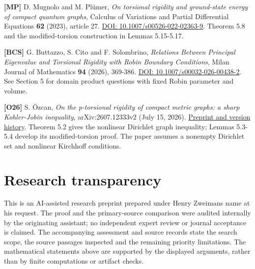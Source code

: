\documentclass[11pt]{article}
\begin{document}
\textbf{{[}MP{]}} D. Mugnolo and M. Plümer, \emph{On torsional rigidity
and ground-state energy of compact quantum graphs}, Calculus of
Variations and Partial Differential Equations \textbf{62} (2023),
article 27. \href{https://doi.org/10.1007/s00526-022-02363-9}{DOI:
10.1007/s00526-022-02363-9}. Theorem 5.8 and the modified-torsion
construction in Lemmas 5.15-5.17.

\textbf{{[}BCS{]}} G. Buttazzo, S. Cito and F. Solombrino,
\emph{Relations Between Principal Eigenvalue and Torsional Rigidity with
Robin Boundary Conditions}, Milan Journal of Mathematics \textbf{94}
(2026), 369-386. \href{https://doi.org/10.1007/s00032-026-00438-2}{DOI:
10.1007/s00032-026-00438-2}. See Section 5 for domain product questions
with fixed Robin parameter and volume.

\textbf{{[}O26{]}} S. Özcan, \emph{On the p-torsional rigidity of
compact metric graphs: a sharp Kohler-Jobin inequality},
arXiv:2607.12333v2 (July 15, 2026).
\href{https://arxiv.org/abs/2607.12333}{Preprint and version history}.
Theorem 5.2 gives the nonlinear Dirichlet graph inequality; Lemmas
5.3-5.4 develop its modified-torsion proof. The paper assumes a nonempty
Dirichlet set and nonlinear Kirchhoff conditions.

\section{Research transparency}\label{research-transparency}

This is an AI-assisted research preprint prepared under Henry
Zweiman\textquotesingle s name at his request. The proof and the
primary-source comparison were audited internally by the originating
assistant; no independent expert review or journal acceptance is
claimed. The accompanying assessment and source records state the search
scope, the source passages inspected and the remaining priority
limitations. The mathematical statements above are supported by the
displayed arguments, rather than by finite computations or artifact
checks.
\end{document}
